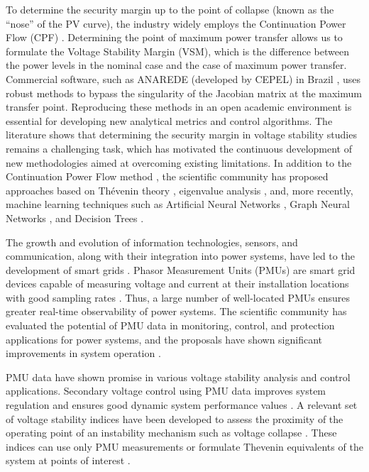 \documentclass{ieeeaccess}
\begin{document}
To determine the security margin up to the point of collapse (known as the ``nose'' of the PV curve), the industry widely employs the Continuation Power Flow (CPF) \cite{Ajjarapu1992}. Determining the point of maximum power transfer allows us to formulate the Voltage Stability Margin (VSM), which is the difference between the power levels in the nominal case and the case of maximum power transfer. Commercial software, such as ANAREDE (developed by CEPEL) in Brazil \cite{cepel2009anarede}, uses robust methods to bypass the singularity of the Jacobian matrix at the maximum transfer point. Reproducing these methods in an open academic environment is essential for developing new analytical metrics and control algorithms. The literature shows that determining the security margin in voltage stability studies remains a challenging task, which has motivated the continuous development of new methodologies aimed at overcoming existing limitations. In addition to the Continuation Power Flow method \cite{Ajjarapu1992}, the scientific community has proposed approaches based on Thévenin theory \cite{Corsi2008}, eigenvalue analysis \cite{Bento2018}, and, more recently, machine learning techniques such as Artificial Neural Networks \cite{Zhou2010}, Graph Neural Networks \cite{Guddanti2023}, and Decision Trees \cite{Meng2020}.

The growth and evolution of information technologies, sensors, and communication, along with their integration into power systems, have led to the development of smart grids \cite{Li2010}. Phasor Measurement Units (PMUs) are smart grid devices capable of measuring voltage and current at their installation locations with good sampling rates \cite{Li2010}. Thus, a large number of well-located PMUs ensures greater real-time observability of power systems. The scientific community has evaluated the potential of PMU data in monitoring, control, and protection applications for power systems, and the proposals have shown significant improvements in system operation \cite{Ippolito2024,Bento2024,Shazdeh2023,Wang2024}.

PMU data have shown promise in various voltage stability analysis and control applications. Secondary voltage control using PMU data improves system regulation and ensures good dynamic system performance values \cite{Pierrou2024,Su2018,Chiodo2024}. A relevant set of voltage stability indices have been developed to assess the proximity of the operating point of an instability mechanism such as voltage collapse \cite{modarresi2016comprehensive}. These indices can use only PMU measurements or formulate Thevenin equivalents of the system at points of interest \cite{Pourbagher2022,Lee2019}.
\end{document}
